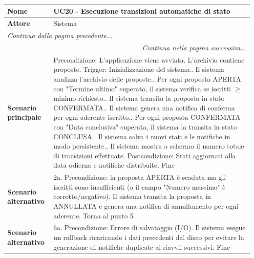 \documentclass[12pt, a4paper, oneside]{report}
\begin{document}
\renewcommand{\arraystretch}{1.4} 

\begin{tabularx}{\textwidth}{|l|X|}
    \hline
    \textbf{Nome}               & \textbf{UC20 - Esecuzione transizioni automatiche di stato} \\ \hline
    \textbf{Attore}             & Sistema \\ \hline
    \endfirsthead 
    \hline
    \multicolumn{2}{|l|}{\textit{Continua dalla pagina precedente...}} \\ \hline
    \endhead 
    \hline
    \multicolumn{2}{|r|}{\textit{Continua nella pagina successiva...}} \\ \hline
    \endfoot 
    \hline
    \endlastfoot
    \textbf{Scenario principale} & 
    Precondizione: L'applicazione viene avviata. L'archivio contiene proposte.\newline
    Trigger: Inizializzazione del sistema.\newline
    1. Il sistema analizza l'archivio delle proposte.\newline
    2. Per ogni proposta APERTA con "Termine ultimo" superato, il sistema verifica se iscritti $\ge$ minimo richiesto.\newline
    3. Il sistema transita la proposta in stato CONFERMATA.\newline
    4. Il sistema genera una notifica di conferma per ogni aderente iscritto.\newline
    5. Per ogni proposta CONFERMATA con "Data conclusiva" superata, il sistema la transita in stato CONCLUSA.\newline
    6. Il sistema salva i nuovi stati e le notifiche in modo persistente.\newline
    7. Il sistema mostra a schermo il numero totale di transizioni effettuate.\newline
    Postcondizione: Stati aggiornati alla data odierna e notifiche distribuite.\newline
    Fine \\ \hline
    \textbf{Scenario alternativo} & 
    2a. Precondizione: la proposta APERTA è scaduta ma gli iscritti sono insufficienti (o il campo "Numero massimo" è corrotto/negativo).\newline
    Il sistema transita la proposta in ANNULLATA e genera una notifica di annullamento per ogni aderente.\newline
    Torna al punto 5 \\ \hline
    \textbf{Scenario alternativo} & 
    6a. Precondizione: Errore di salvataggio (I/O).\newline
    Il sistema esegue un rollback ricaricando i dati precedenti dal disco per evitare la generazione di notifiche duplicate ai riavvii successivi.\newline
    Fine \\ \hline
\end{tabularx}
\end{document}
